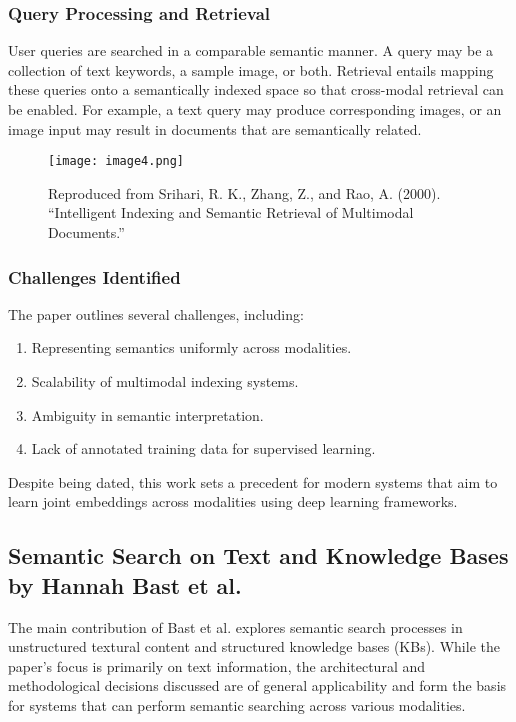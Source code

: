 \documentclass[conference]{IEEEtran}
\begin{document}
\subsubsection{Query Processing and Retrieval}
User queries are searched in a comparable semantic manner. A query may be a collection of text keywords, a sample image, or both. Retrieval entails mapping these queries onto a semantically indexed space so that cross-modal retrieval can be enabled. For example, a text query may produce corresponding images, or an image input may result in documents that are semantically related.

\begin{figure}
    \centering
    \texttt{[image: image4.png]}
    \caption{Reproduced from Srihari, R. K., Zhang, Z., and Rao, A. (2000). “Intelligent Indexing and Semantic Retrieval of Multimodal Documents.”}
    \label{fig:enter-label}
\end{figure}

\subsubsection{Challenges Identified}
The paper outlines several challenges, including:
\begin{enumerate}
    \item Representing semantics uniformly across modalities.
    \item Scalability of multimodal indexing systems.
    \item Ambiguity in semantic interpretation.
    \item Lack of annotated training data for supervised learning.
\end{enumerate}

Despite being dated, this work sets a precedent for modern systems that aim to learn joint embeddings across modalities using deep learning frameworks.

\subsection{Semantic Search on Text and Knowledge Bases by Hannah Bast et al.}
The main contribution of Bast et al.\cite{bast2016semantic} explores semantic search processes in unstructured textural content and structured knowledge bases (KBs). While the paper's focus is primarily on text information, the architectural and methodological decisions discussed are of general applicability and form the basis for systems that can perform semantic searching across various modalities.
\end{document}
